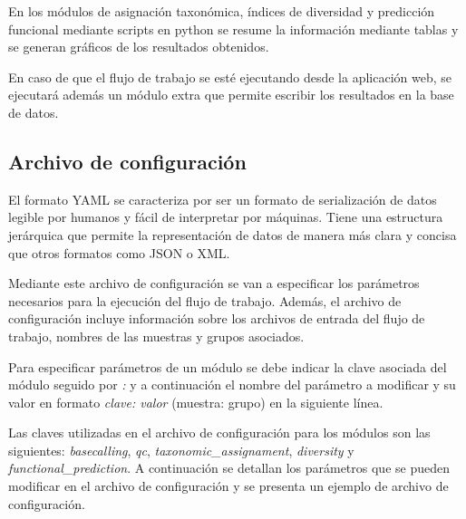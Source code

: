 En los módulos de asignación taxonómica, índices de diversidad y predicción funcional mediante scripts en python se resume la información mediante tablas y se generan gráficos de los resultados obtenidos.

En caso de que el flujo de trabajo se esté ejecutando desde la aplicación web, se ejecutará además un módulo extra que permite escribir los resultados en la base de datos.

\subsection{Archivo de configuración} \label{subsection:conf_file}
El formato YAML se caracteriza por ser un formato de serialización de datos legible por humanos y fácil de interpretar por máquinas.
Tiene una estructura jerárquica que permite la representación de datos de manera más clara y concisa que otros formatos como JSON o XML.

Mediante este archivo de configuración se van a especificar los parámetros necesarios para la ejecución del flujo de trabajo.
Además, el archivo de configuración incluye información sobre los archivos de entrada del flujo de trabajo, nombres de las muestras y grupos asociados.

Para especificar parámetros de un módulo se debe indicar la clave asociada del módulo seguido por \textit{:} y a continuación el nombre del parámetro a modificar y su valor en formato \textit{clave: valor} (muestra: grupo) en la siguiente línea.

Las claves utilizadas en el archivo de configuración para los módulos son las siguientes: \textit{basecalling}, \textit{qc}, \textit{taxonomic\_assignament}, \textit{diversity} y \textit{functional\_prediction}.
A continuación se detallan los parámetros que se pueden modificar en el archivo de configuración y se presenta un ejemplo de archivo de configuración.%

